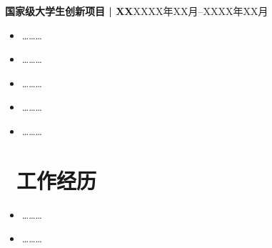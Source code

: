 \documentclass[11pt]{article}
\begin{document}
{\bfseries 国家级大学生创新项目\hspace{0.2em} | \hspace{0.2em}XX}\hfill XXXX年XX月\hspace{0.5em}--\hspace{0.5em}XXXX年XX月
\begin{itemize}
    \item {\ldots\ldots\ldots}
    \item {\ldots\ldots\ldots}
    \item {\ldots\ldots\ldots}
    \item {\ldots\ldots\ldots}
    \item {\ldots\ldots\ldots}
\end{itemize}



\section{\texorpdfstring{\makebox[\widthof{\faUsers}][c]{\color{ZZU_BLUE}\faUsers}\ 工作经历}{工作经历}}

\begin{itemize}
    \item {\ldots\ldots\ldots}
    \item {\ldots\ldots\ldots}
\end{itemize}

\end{document}
